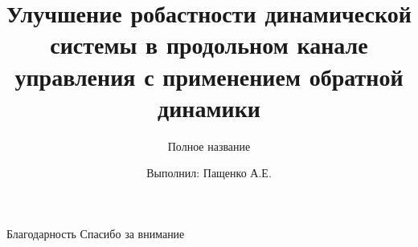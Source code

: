 \documentclass[unicode]{beamer}   %
\title[Дипломная работа]{Улучшение робастности динамической системы в продольном канале управления с применением обратной динамики}
\subtitle[Краткое название]{Полное название}
\author{Выполнил: Пащенко А.Е.}
\date{}
\begin{document}
\maketitle







% 


\begin{frame}{Благодарность}
\centering
\huge    %
Спасибо за внимание
\end{frame}
\end{document}
